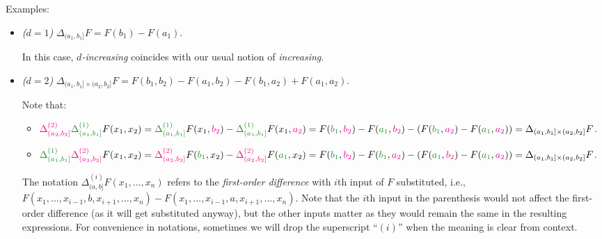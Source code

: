 \begin{enumerate}
\begin{itemize}
Examples:
\begin{itemize}
\item \emph{(\(d=1\))} \(\Delta_{(a_1,b_1]}F=F(b_1)-F(a_1)\).
\begin{note}
In this case, \emph{\(d\)-increasing} coincides with our usual notion of \emph{increasing}.
\end{note}
\item \emph{(\(d=2\))} \(\Delta_{(a_1,b_1]\times (a_2,b_2]}F
=F(b_1,b_2)-F(a_1,b_2)-F(b_1,a_2)+F(a_1,a_2)\).

Note that:
\begin{itemize}
\item \(\mgc{\Delta_{(a_2,b_2]}^{(2)}}\gc{\Delta_{(a_1,b_1]}^{(1)}}F(x_1,x_2)
=\gc{\Delta_{(a_1,b_1]}^{(1)}}F(x_1,\mgc{b_2})-\gc{\Delta_{(a_1,b_1]}^{(1)}}F(x_1,\mgc{a_2})
=F(\gc{b_1},\mgc{b_2})-F(\gc{a_1},\mgc{b_2})
-(F(\gc{b_1},\mgc{a_2})-F(\gc{a_1},\mgc{a_2}))
=\Delta_{(a_1,b_1]\times (a_2,b_2]}F\).
\item \(\gc{\Delta_{(a_1,b_1]}^{(1)}}\mgc{\Delta_{(a_2,b_2]}^{(2)}}F(x_1,x_2)
=\mgc{\Delta_{(a_2,b_2]}^{(2)}}F(\gc{b_1},x_2)-\mgc{\Delta_{(a_2,b_2]}^{(2)}}F(\gc{a_1},x_2)
=F(\gc{b_1},\mgc{b_2})-F(\gc{b_1},\mgc{a_2})
-(F(\gc{a_1},\mgc{b_2})-F(\gc{a_1},\mgc{a_2}))
=\Delta_{(a_1,b_1]\times (a_2,b_2]}F\).
\end{itemize}
\begin{note}
The notation \(\Delta_{(a,b]}^{(i)}F(x_1,\dotsc,x_n)\) refers to the
\emph{first-order difference} with \(i\)th input of \(F\) substituted, i.e.,
\(F(x_1,\dotsc,x_{i-1},b,x_{i+1},\dotsc,x_n)-F(x_1,\dotsc,x_{i-1},a,x_{i+1},\dotsc,x_n)\).
Note that the \(i\)th input in the parenthesis would not affect the first-order
difference (as it will get substituted anyway), but the other inputs matter as
they would remain the same in the resulting expressions. For convenience in
notations, sometimes we will drop the superscript ``\((i)\)'' when the meaning
is clear from context.
\end{note}
\end{itemize}
\end{itemize}


\end{enumerate}
